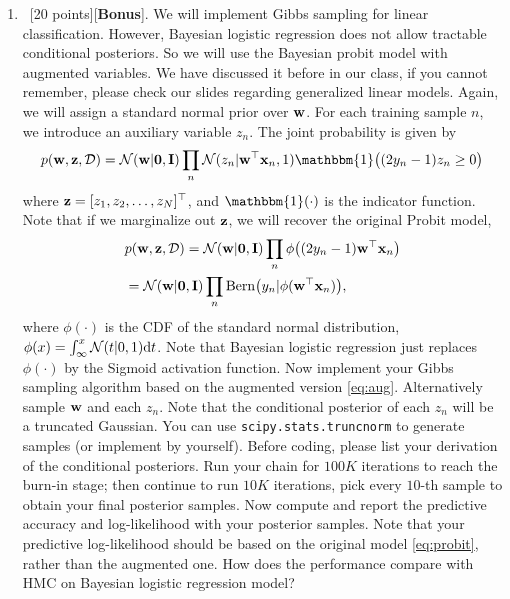 \documentclass[12pt, fullpage,letterpaper]{article}
\begin{document}
\begin{enumerate}
\begin{enumerate}
		\item~[20 points][\textbf{Bonus}]. We will implement Gibbs sampling for linear classification. However, Bayesian logistic regression does not allow tractable conditional posteriors. So we will use the Bayesian probit model with augmented variables. We have discussed it before in our class, if you cannot remember, please check our slides regarding generalized linear models. Again, we will assign a standard normal prior over ${\bf w}$. For each training sample $n$, we introduce an auxiliary variable $z_n$. The joint probability is given by
		\begin{align}
		p(\w, \z, \Dcal) = \N(\w|\0, \I)\prod_n \N(z_n|\w^\top \x_n, 1)\mathbbm{1}\big((2y_n-1)z_n\ge 0\big) \label{eq:aug}
		\end{align}
		where ${\bf z} = [z_1, z_2, \ldots, z_N]^\top$, and $\mathbbm{1}(\cdot)$ is the indicator function. Note that if we marginalize out ${\bf z}$, we will recover the original Probit model, 
		\begin{align}
		&p({\bf w}, {\bf z}, \mathcal{D}) = \mathcal{N}({\bf w}|{\bf 0}, {\bf I})\prod_n \phi\big((2y_n-1){\bf w}^\top {\bf x}_n\big) \notag \\
		&=\mathcal{N}({\bf w}|{\bf 0}, {\bf I})\prod_n \mathrm{Bern}\big(y_n|\phi({\bf w}^\top {\bf x}_n)\big), \label{eq:probit}
		\end{align}
		where $\phi(\cdot)$ is the CDF of the standard normal distribution, $\phi(x) = \int_\infty^x \mathcal{N}(t|0, 1){\rm d} t$. Note that Bayesian logistic regression just replaces $\phi(\cdot)$ by the Sigmoid activation function. Now implement your Gibbs sampling algorithm based on the augmented version \eqref{eq:aug}. Alternatively sample ${\bf w}$ and each $z_n$. Note that the conditional posterior of each $z_n$ will be a truncated Gaussian. You can use \texttt{scipy.stats.truncnorm} to generate samples (or implement by yourself). Before coding, please list your derivation of the conditional posteriors. Run your chain for $100K$ iterations to reach the burn-in stage; then continue to run $10K$ iterations, pick every $10$-th sample to obtain your final posterior samples. Now compute and report the predictive accuracy and log-likelihood with your posterior samples. Note that your predictive log-likelihood should be based on the original model \eqref{eq:probit}, rather than the augmented one. How does the performance compare with HMC on Bayesian logistic regression model?
		

\end{enumerate}
\end{enumerate}
\end{document}
